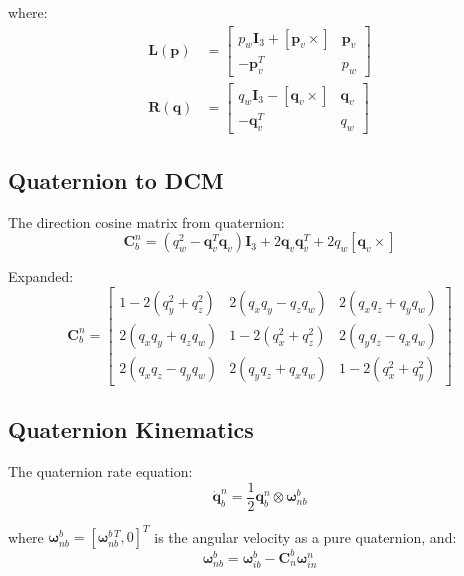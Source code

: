 \documentclass[11pt,a4paper]{article}
\newcommand{\mat}[1]{\mathbf{#1}}
\newcommand{\vect}[1]{\boldsymbol{#1}}
\newcommand{\quat}[1]{\mathbf{#1}}
\newcommand{\skewmat}[1]{\left[#1 \times\right]}
\begin{document}
where:
\begin{align}
    \mat{L}(\quat{p}) &= \begin{bmatrix}
        p_w \mat{I}_3 + \skewmat{\vect{p}_v} & \vect{p}_v \\
        -\vect{p}_v^T & p_w
    \end{bmatrix} \\
    \mat{R}(\quat{q}) &= \begin{bmatrix}
        q_w \mat{I}_3 - \skewmat{\vect{q}_v} & \vect{q}_v \\
        -\vect{q}_v^T & q_w
    \end{bmatrix}
\end{align}

\subsection{Quaternion to DCM}

The direction cosine matrix from quaternion:
\begin{equation}
    \mat{C}_b^n = (q_w^2 - \vect{q}_v^T\vect{q}_v)\mat{I}_3 + 2\vect{q}_v\vect{q}_v^T + 2q_w\skewmat{\vect{q}_v}
\end{equation}

Expanded:
\begin{equation}
    \mat{C}_b^n = \begin{bmatrix}
        1-2(q_y^2+q_z^2) & 2(q_xq_y-q_zq_w) & 2(q_xq_z+q_yq_w) \\
        2(q_xq_y+q_zq_w) & 1-2(q_x^2+q_z^2) & 2(q_yq_z-q_xq_w) \\
        2(q_xq_z-q_yq_w) & 2(q_yq_z+q_xq_w) & 1-2(q_x^2+q_y^2)
    \end{bmatrix}
    \label{eq:quat_to_dcm}
\end{equation}

\subsection{Quaternion Kinematics}

The quaternion rate equation:
\begin{equation}
    \dot{\quat{q}}_b^n = \frac{1}{2} \quat{q}_b^n \otimes \quat{\omega}_{nb}^b
    \label{eq:quat_kinematics}
\end{equation}

where $\quat{\omega}_{nb}^b = [\vect{\omega}_{nb}^{b\,T}, 0]^T$ is the angular velocity as a pure quaternion, and:
\begin{equation}
    \vect{\omega}_{nb}^b = \vect{\omega}_{ib}^b - \mat{C}_n^b \vect{\omega}_{in}^n
\end{equation}
\end{document}
